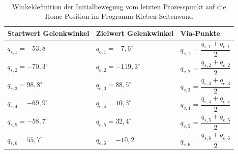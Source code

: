 \\
\begin{table}[tbph]
\centering
\caption{Winkeldefinition der Initialbewegung vom letzten Prozesspunkt auf die  Home Position im Programm Kleben-Seitenwand}
\label{tab:simu}
\begin{tabular}{|l|l|l|}
	\hline
	Startwert Gelenkwinkel&  Zielwert Gelenkwinkel&  Via-Punkte\\
	\hline
	$q_{s,1} = -53,8$&  $q_{e,1} = -7,6^{\circ}$  &$q_{v,1}$ = $\dfrac{q_{s,1}+q_{e,1}}{2}$  \\
	\hline
	$q_{s,2} = -70,3^{\circ}$&  $q_{e,2} = -119,3^{\circ}$    &$q_{v,2}$ = $\dfrac{q_{s,2}+q_{e,2}}{2}$  \\
	\hline
	$q_{s,3} = 98,8^{\circ}$&  $q_{e,3} = 88,5^{\circ}$&$q_{v,3}$ = $\dfrac{q_{s,3}+q_{e,3}}{2}$  \\
	\hline
	$q_{s,4} = -69,9^{\circ}$&  $q_{e,4} = 10,3^{\circ}$&$q_{v,4}$ = $\dfrac{q_{s,4}+q_{e,4}}{2}$  \\
	\hline
	$q_{s,5} = -58,7^{\circ}$&  $q_{e,5} = 32,4^{\circ}$  &$q_{v,5}$ = $\dfrac{q_{s,5}+q_{e,5}}{2}$  \\
	\hline
	$q_{s,6} = 55,7^{\circ}$&  $q_{e,6} = -10,2^{\circ}$&$q_{v,6}$ = $\dfrac{q_{s,6}+q_{e,6}}{2}$  \\
	\hline
\end{tabular}
\end{table}
\\
